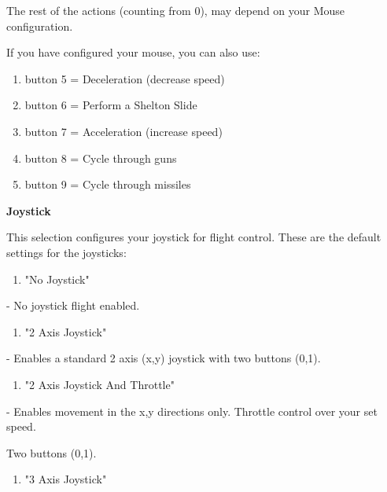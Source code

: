 \documentclass{article}
\begin{document}
The rest of the actions (counting from 0), may depend on your Mouse configuration.

If you have configured your mouse, you can also use:

\begin{enumerate}
\item  button 5 = Deceleration (decrease speed) 

\item  button 6 = Perform a Shelton Slide 

\item  button 7 = Acceleration (increase speed) 

\item  button 8 = Cycle through guns 

\item  button 9 = Cycle through missiles 
\end{enumerate}





\eject 

\textbf{Joystick }

This selection configures your joystick for flight control. These are the default settings for the joysticks:



\begin{enumerate}
\item  "No Joystick" 
\end{enumerate}

 - No joystick flight enabled. 

\begin{enumerate}
\item  "2 Axis Joystick" 
\end{enumerate}

 - Enables a standard 2 axis (x,y) joystick with two buttons (0,1). 

\begin{enumerate}
\item  "2 Axis Joystick And Throttle" 
\end{enumerate}

 - Enables movement in the x,y directions only. Throttle control over your set speed. 

 Two buttons (0,1). 

\begin{enumerate}
\item  "3 Axis Joystick" 
\end{enumerate}
\end{document}
